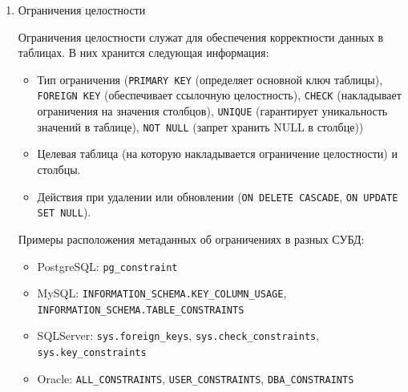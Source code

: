 \begin{enumerate}
    Примеры расположения индексов в разных СУБД:
    \begin{itemize}
        \item PostgreSQL: \texttt{pg\_index}, \texttt{pg\_class}, \texttt{pg\_indexes}.
        \item MySQL: \texttt{INFORMATION\_SCHEMA.STATISTICS}.
        \item SQL Server: \texttt{sys.indexes}, \texttt{sys.index\_columns}.
        \item Oracle: \texttt{DBA\_INDEXES}, \texttt{USER\_INDEXES}.
    \end{itemize}

    Пример SQL-запроса (Oracle, получение информации об индексах таблицы):
    \begin{lstlisting}[language=SQL]
    SELECT INDEX_NAME, TABLE_NAME, UNIQUENESS, STATUS 
    FROM DBA_INDEXES 
    WHERE TABLE_NAME = 'EMPLOYEES';
    \end{lstlisting}

    \item Ограничения целостности \autocites[§51.13]{PostgreSQLdocc51}[§28.3.42]{Mysqldoc1}{MicrosoftLearnSQLserverTab}

    Ограничения целостности служат для обеспечения корректности данных в таблицах. В них хранится следующая информация:
    \begin{itemize}
        \item Тип ограничения (\texttt{PRIMARY KEY} (определяет основной ключ таблицы), \texttt{FOREIGN KEY} (обеспечивает ссылочную целостность), \texttt{CHECK} (накладывает ограничения на значения столбцов), \texttt{UNIQUE} (гарантирует уникальность значений в таблице), \texttt{NOT NULL} (запрет хранить NULL в столбце))
        \item Целевая таблица (на которую накладывается ограничение целостности) и столбцы.
        \item Действия при удалении или обновлении (\texttt{ON DELETE CASCADE}, \texttt{ON UPDATE SET NULL}).
    \end{itemize}

    Примеры расположения метаданных об ограничениях в разных СУБД:
    \begin{itemize}
        \item PostgreSQL: \texttt{pg\_constraint}
        \item MySQL: \texttt{INFORMATION\_SCHEMA.KEY\_COLUMN\_USAGE}, \texttt{INFORMATION\_SCHEMA.TABLE\_CONSTRAINTS}
        \item SQLServer: \texttt{sys.foreign\_keys}, \texttt{sys.check\_constraints}, \texttt{sys.key\_constraints}
        \item Oracle: \texttt{ALL\_CONSTRAINTS}, \texttt{USER\_CONSTRAINTS}, \texttt{DBA\_CONSTRAINTS}
    \end{itemize}


\end{enumerate}
